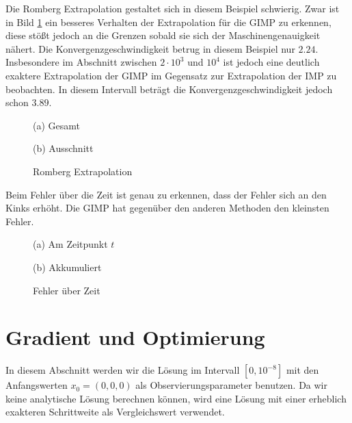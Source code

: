 Die Romberg Extrapolation gestaltet sich in diesem Beispiel schwierig. Zwar ist in Bild \ref{fig:lcRomberg} ein besseres Verhalten der Extrapolation für die GIMP zu erkennen, diese stößt jedoch an die Grenzen sobald sie sich der Maschinengenauigkeit nähert.  Die Konvergenzgeschwindigkeit betrug in diesem Beispiel nur $2.24$. Insbesondere im Abschnitt zwischen $2\cdot 10^{3}$ und $10^4$ ist jedoch eine deutlich exaktere Extrapolation der GIMP im Gegensatz zur Extrapolation der IMP zu beobachten. In diesem Intervall beträgt die Konvergenzgeschwindigkeit jedoch schon $3.89$. 
\begin{figure}[H]
\footnotesize 
\centering
\begin{minipage}[b]{0.49\linewidth}

\caption*{(a) Gesamt}
\end{minipage}
\begin{minipage}[b]{0.49\linewidth}

\caption*{(b) Ausschnitt}
\end{minipage}
\caption{Romberg Extrapolation}
\label{fig:lcRomberg}
\end{figure}



Beim Fehler über die Zeit ist genau zu erkennen, dass der Fehler sich an den Kinks erhöht. Die GIMP hat gegenüber den anderen Methoden den kleinsten Fehler. 
\begin{figure}[H]
\footnotesize 
\centering
\begin{minipage}[b]{0.49\linewidth}

\caption*{(a) Am Zeitpunkt $t$}
\end{minipage}
\begin{minipage}[b]{0.49\linewidth}

\caption*{(b) Akkumuliert}
\end{minipage}
\caption{Fehler über Zeit}
\end{figure}
\section{Gradient und Optimierung}
In diesem Abschnitt werden wir die Lösung im Intervall $[0,10^{-8}]$ mit den Anfangswerten $x_0=(0,0,0)$ als Observierungsparameter benutzen. Da wir keine analytische Lösung berechnen können, wird eine Lösung mit einer erheblich exakteren Schrittweite als Vergleichswert verwendet.

